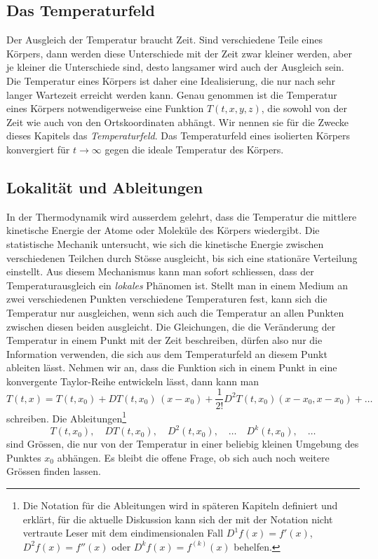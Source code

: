 \subsection{Das Temperaturfeld}
Der Ausgleich der Temperatur braucht Zeit.
Sind verschiedene Teile eines Körpers, dann werden diese Unterschiede
mit der Zeit zwar kleiner werden, aber je kleiner die Unterschiede sind,
desto langsamer wird auch der Ausgleich sein.
Die Temperatur eines Körpers ist daher eine Idealisierung, die nur
nach sehr langer Wartezeit erreicht werden kann.
Genau genommen ist die Temperatur eines Körpers notwendigerweise eine
Funktion $T(t,x,y,z)$, die sowohl von der Zeit wie auch von den
Ortskoordinaten abhängt.
Wir nennen sie für die Zwecke dieses Kapitels das {\em Temperaturfeld}.
Das Temperaturfeld eines isolierten Körpers konvergiert für
$t\to\infty$ gegen die ideale Temperatur des Körpers.

\subsection{Lokalität und Ableitungen}
In der Thermodynamik wird ausserdem gelehrt, dass die Temperatur die
mittlere kinetische Energie der Atome oder Moleküle des Körpers wiedergibt.
Die statistische Mechanik untersucht, wie sich die kinetische Energie
zwischen verschiedenen Teilchen durch Stösse ausgleicht, bis sich eine
stationäre Verteilung einstellt.
Aus diesem Mechanismus kann man sofort schliessen, dass der
Temperaturausgleich ein {\em lokales} Phänomen ist.
Stellt man in einem Medium an zwei verschiedenen Punkten verschiedene
Temperaturen fest, kann sich die Temperatur nur ausgleichen, wenn
sich auch die Temperatur an allen Punkten zwischen diesen beiden
ausgleicht.
Die Gleichungen, die die Veränderung der Temperatur in einem Punkt
mit der Zeit beschreiben, dürfen also nur die Information verwenden,
die sich aus dem Temperaturfeld an diesem Punkt ableiten lässt.
Nehmen wir an, dass die Funktion sich in einem Punkt in eine konvergente
Taylor-Reihe entwickeln lässt, dann kann man
\[
T(t,x)
=
T(t,x_0) + DT(t,x_0)\, (x-x_0) + \frac{1}{2!} D^2T(t,x_0)(x-x_0,x-x_0) + \dots
\]
schreiben.
Die Ableitungen\footnote{Die Notation für die Ableitungen wird
in späteren Kapiteln definiert und erklärt, für die aktuelle Diskussion
kann sich der mit der Notation nicht vertraute Leser mit dem eindimensionalen
Fall $D^1f(x) = f'(x)$, $D^2f(x) = f''(x)$ oder $D^kf(x)=f^{(k)}(x)$ behelfen.}
\[
T(t,x_0), \quad
DT(t,x_0), \quad
D^2(t,x_0),\quad \dots\quad
D^k(t,x_0),\quad\dots
\]
sind Grössen, die nur von der Temperatur in einer beliebig kleinen
Umgebung des Punktes $x_0$ abhängen.
Es bleibt die offene Frage, ob sich auch noch weitere Grössen finden lassen.

